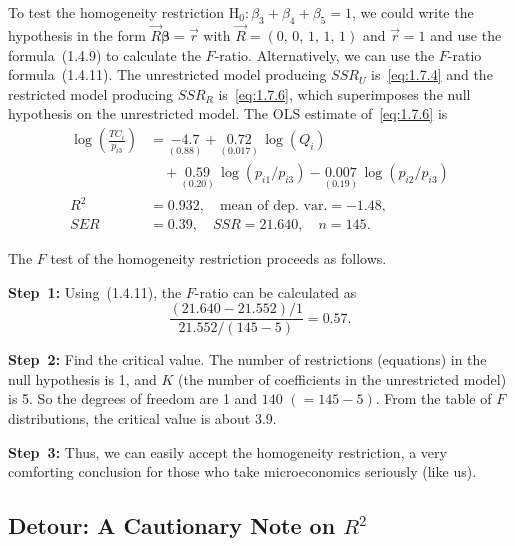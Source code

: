 To test the homogeneity restriction $\text{H}_0\colon \beta_3 + \beta_4 + \beta_5 = 1$,
we could write the hypothesis in the form $\vec{R}\bm{\beta} = \vec{r}$ with
$\vec{R} = (0,\,0,\,1,\,1,\,1)$ and $\vec{r} = 1$ and use the formula~(1.4.9) to
calculate the $F$-ratio.  Alternatively, we can use the $F$-ratio formula~(1.4.11).  The
unrestricted model producing $SSR_U$ is~\eqref{eq:1.7.4} and the restricted model
producing $SSR_R$ is~\eqref{eq:1.7.6}, which superimposes the null hypothesis on the
unrestricted model.  The OLS estimate of~\eqref{eq:1.7.6} is
\begin{equation}
\begin{aligned}
  \log\!\left(\frac{TC_i}{p_{i3}}\right)
  &= \underset{(0.88)}{-4.7} + \underset{(0.017)}{0.72}\,\log(Q_i) \\
  &\quad + \underset{(0.20)}{0.59}\,\log(p_{i1}/p_{i3})
    - \underset{(0.19)}{0.007}\,\log(p_{i2}/p_{i3}) \\[6pt]
  R^2 &= 0.932,\quad \text{mean of dep.\ var.} = -1.48, \\
  SER &= 0.39,\quad SSR = 21.640,\quad n = 145.
\end{aligned}
\label{eq:1.7.8}
\end{equation}

The $F$ test of the homogeneity restriction proceeds as follows.

\textbf{Step~1:} Using~(1.4.11), the $F$-ratio can be calculated as
\[
  \frac{(21.640 - 21.552)/1}{21.552/(145 - 5)} = 0.57.
\]

\textbf{Step~2:} Find the critical value.  The number of restrictions (equations) in
the null hypothesis is 1, and $K$ (the number of coefficients in the unrestricted
model) is 5.  So the degrees of freedom are 1 and $140$ $(= 145 - 5)$.  From the table
of $F$ distributions, the critical value is about 3.9.

\textbf{Step~3:} Thus, we can easily accept the homogeneity restriction, a very
comforting conclusion for those who take microeconomics seriously (like us).

\subsection*{Detour: A Cautionary Note on $R^2$}

